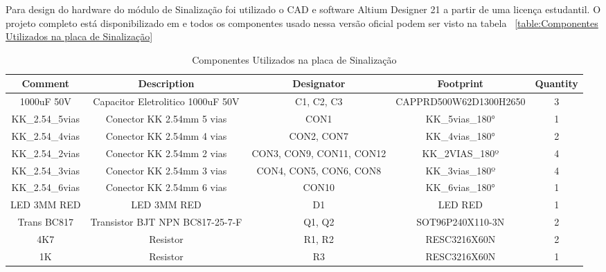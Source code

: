 \documentclass[../delivery_hospital_report.tex]{subfiles}
\begin{document}
Para design do hardware do módulo de Sinalização foi utilizado o CAD e software Altium Designer 21 \cite{altium21} a partir de uma licença estudantil. O projeto completo está disponibilizado em \cite{github_modulos} e todos os componentes usado nessa versão oficial podem ser visto na tabela ~\ref{table:Componentes Utilizados na placa de Sinalização}

\begin{table}[!ht]
\caption{Componentes Utilizados na placa de Sinalização}
\centering
\begin{adjustbox}{width=\columnwidth,center}
\begin{tabular}{|c|c|c|c|c|}
\hline
Comment                   & Description                                  & Designator                & Footprint                 & Quantity \\ \hline
1000uF 50V                & Capacitor Eletrolitico 1000uF 50V            & C1, C2, C3                & CAPPRD500W62D1300H2650    & 3        \\ \hline
KK\_2.54\_5vias           & Conector KK 2.54mm 5 vias                    & CON1                      & KK\_5vias\_180°           & 1        \\ \hline
KK\_2.54\_4vias           & Conector KK 2.54mm 4 vias                    & CON2, CON7                & KK\_4vias\_180°           & 2        \\ \hline
KK\_2.54\_2vias           & Conector KK 2.54mm 2 vias                    & CON3, CON9, CON11, CON12  & KK\_2VIAS\_180º           & 4        \\ \hline
KK\_2.54\_3vias           & Conector KK 2.54mm 3 vias                    & CON4, CON5, CON6, CON8    & KK\_3vias\_180º           & 4        \\ \hline
KK\_2.54\_6vias           & Conector KK 2.54mm 6 vias                    & CON10                     & KK\_6vias\_180°           & 1        \\ \hline
LED 3MM RED               & LED 3MM RED                                  & D1                        & LED RED                   & 1        \\ \hline
Trans BC817               & Transistor BJT NPN BC817-25-7-F              & Q1, Q2                    & SOT96P240X110-3N          & 2        \\ \hline
4K7                       & Resistor                                     & R1, R2                    & RESC3216X60N              & 2        \\ \hline
1K                        & Resistor                                     & R3                        & RESC3216X60N              & 1        \\ \hline

\end{tabular}
\end{adjustbox}
\end{table}
\end{document}
